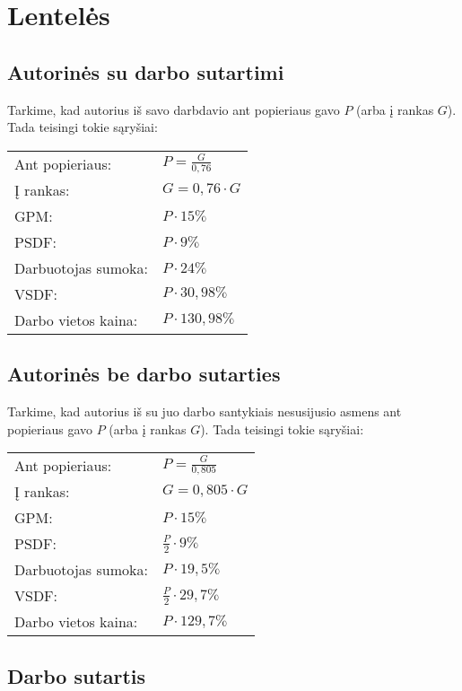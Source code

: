 \chapter{Lentelės}

\section{Autorinės su darbo sutartimi}

Tarkime, kad autorius iš savo darbdavio ant popieriaus gavo $P$ (arba
į rankas $G$). Tada teisingi tokie sąryšiai:

\begin{tabularx}{15cm}{p{7.5cm}|p{7.5cm}}
  Ant popieriaus: & $P = \frac{G}{0,76}$ \\
  Į rankas: & $G = 0,76 \cdot G$ \\
  GPM: & $P \cdot 15\%$ \\
  PSDF: & $P \cdot 9\%$ \\
  Darbuotojas sumoka: & $P \cdot 24\%$ \\
  VSDF: & $P \cdot 30,98\%$ \\
  Darbo vietos kaina: & $P \cdot 130,98\%$ \\
\end{tabularx}

\section{Autorinės be darbo sutarties}

Tarkime, kad autorius iš su juo darbo santykiais nesusijusio
asmens ant popieriaus gavo $P$ (arba į rankas $G$). Tada teisingi tokie
sąryšiai:

\begin{tabularx}{15cm}{p{7.5cm}|p{7.5cm}}
  Ant popieriaus: & $P = \frac{G}{0,805}$ \\
  Į rankas: & $G = 0,805 \cdot G$ \\
  GPM: & $P \cdot 15\%$ \\
  PSDF: & $\frac{P}{2} \cdot 9\%$ \\
  Darbuotojas sumoka: & $P \cdot 19,5\%$ \\
  VSDF: & $\frac{P}{2} \cdot 29,7\%$ \\
  Darbo vietos kaina: & $P \cdot 129,7\%$ \\
\end{tabularx}

\section{Darbo sutartis}

